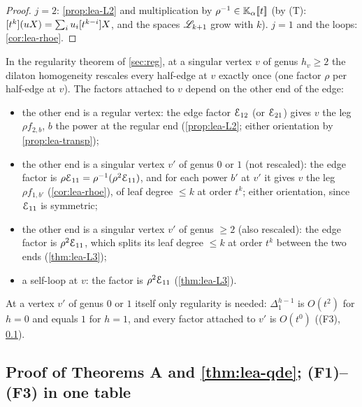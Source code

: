 \begin{proof}
$j = 2$: \cref{prop:lea-L2} and multiplication by $\rho^{-1}\in\mathbb{K}_{\alpha}[\![ t ]\!]$ (by (T): $[t^k](uX) = \sum_iu_i[t^{k-i}]X$, and the spaces $\mathscr{L}_{k+1}$ grow with $k$). $j = 1$ and the loops: \cref{cor:lea-rhoe}.
\end{proof}

\begin{rmk}
\label{rmk:lea-use}
In the regularity theorem of \cref{sec:reg}, at a singular vertex $v$ of genus $h_v\geq 2$ the dilaton homogeneity rescales every half-edge at $v$ exactly once (one factor $\rho$ per half-edge at $v$). The factors attached to $v$ depend on the other end of the edge:
\begin{itemize}
\item the other end is a regular vertex: the edge factor $\mathcal{E}_{12}$ (or $\mathcal{E}_{21}$) gives $v$ the leg $\rho f_{2,b}$, $b$ the power at the regular end (\cref{prop:lea-L2}; either orientation by \cref{prop:lea-transp});
\item the other end is a singular vertex $v'$ of genus $0$ or $1$ (not rescaled): the edge factor is $\rho\mathcal{E}_{11} = \rho^{-1}(\rho^2\mathcal{E}_{11})$, and for each power $b'$ at $v'$ it gives $v$ the leg $\rho f_{1,b'}$ (\cref{cor:lea-rhoe}), of leaf degree $\leq k$ at order $t^k$; either orientation, since $\mathcal{E}_{11}$ is symmetric;
\item the other end is a singular vertex $v'$ of genus $\geq 2$ (also rescaled): the edge factor is $\rho^2\mathcal{E}_{11}$, which splits its leaf degree $\leq k$ at order $t^k$ between the two ends (\cref{thm:lea-L3});
\item a self-loop at $v$: the factor is $\rho^2\mathcal{E}_{11}$ (\cref{thm:lea-L3}).
\end{itemize}
At a vertex $v'$ of genus $0$ or $1$ itself only regularity is needed: $\Delta_1^{h-1}$ is $O(t^2)$ for $h = 0$ and equals $1$ for $h = 1$, and every factor attached to $v'$ is $O(t^0)$ ((F3), \cref{sec:lea-assembly}).
\end{rmk}

\subsection{Proof of Theorems A and \ref{thm:lea-qde}; (F1)--(F3) in one table}
\label{sec:lea-assembly}

